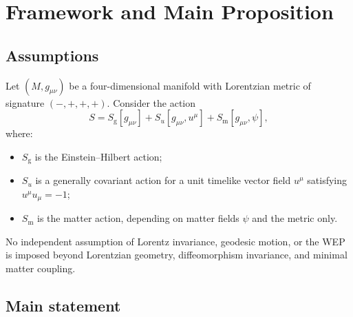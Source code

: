 \documentclass[12pt,a4paper]{article}
\newcommand{\EH}{S_{\mathrm{g}}}
\newcommand{\Su}{S_{u}}
\newcommand{\Sm}{S_{\mathrm{m}}}
\begin{document}
    \section{Framework and Main Proposition}
        \label{sec:proposition}
        
        \subsection{Assumptions}
            
            Let $(M,g_{\mu\nu})$ be a four-dimensional manifold with Lorentzian metric of
            signature $(-,+,+,+)$. Consider the action
            \begin{equation}
                S=\EH[g_{\mu\nu}] + \Su[g_{\mu\nu},u^\mu] + \Sm[g_{\mu\nu},\psi],
                \label{eq:total_action}
            \end{equation}
            where:
            \begin{itemize}[noitemsep]
\item $\EH$ is the Einstein--Hilbert action;
\item $\Su$ is a generally covariant action for a unit timelike vector field
$u^\mu$ satisfying $u^\mu u_\mu=-1$;
\item $\Sm$ is the matter action, depending on matter fields $\psi$ and the
metric only.
            \end{itemize}
            No independent assumption of Lorentz invariance, geodesic motion, or the WEP
            is imposed beyond Lorentzian geometry, diffeomorphism invariance, and minimal
            matter coupling.
        
        \subsection{Main statement}
            
\end{document}
